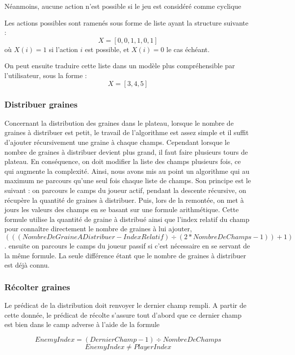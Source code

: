 \documentclass[]{article}
\begin{document}
Néanmoins, aucune action n'est possible si le jeu est considéré comme cyclique

Les actions possibles sont ramenés sous forme de liste ayant la structure suivante : 
$$X = [0,0,1,1,0,1]$$ où $X(i) = 1$ si l'action $i$ est possible, et $X(i) = 0$ le cas échéant.

On peut ensuite traduire cette liste dans un modèle plus compréhensible par l'utilisateur, sous la forme :
$$X = [3,4,5]$$

\subsubsection{Distribuer graines}

	Concernant la distribution des graines dans le plateau, lorsque le nombre de graines à distribuer est petit, le travail de l'algorithme est assez simple et il suffit d'ajouter récursivement une graine à chaque champs.
Cependant lorsque le nombre de graines à distribuer devient plus grand, il faut faire plusieurs tours de plateau. En conséquence, on doit modifier la liste des champs plusieurs fois, ce qui augmente la complexité.
Ainsi, nous avons mis au point un algorithme qui au maximum ne parcours qu'une seul fois chaque liste de champs.
Son principe est le suivant :
	on parcours le camps du joueur actif, pendant la descente récursive, on récupère la quantité de graines à distribuer. Puis, lors de la remontée, on met à jours les valeurs des champs en se basant sur une formule arithmétique. Cette formule utilise la quantité de graine à distribué ainsi que l'index relatif du champ pour connaître directement le nombre de graines à lui ajouter, $$(((NombreDeGraineADistribuer-IndexRelatif) \div (2*NombreDeChamps-1)) + 1)$$.
	ensuite on parcours le camps du joueur passif si c'est nécessaire en se servant de la même formule. La seule différence étant que le nombre de graines à distribuer est déjà connu.

\subsubsection{Récolter graines}

Le prédicat de la distribution doit renvoyer le dernier champ rempli. A partir de cette donnée, le prédicat de récolte s'assure tout d'abord que ce dernier champ est bien dans le camp adverse à l'aide de la formule 

$$EnemyIndex = (DernierChamp-1) \div NombreDeChamps$$
$$EnemyIndex \neq PlayerIndex$$
\end{document}
